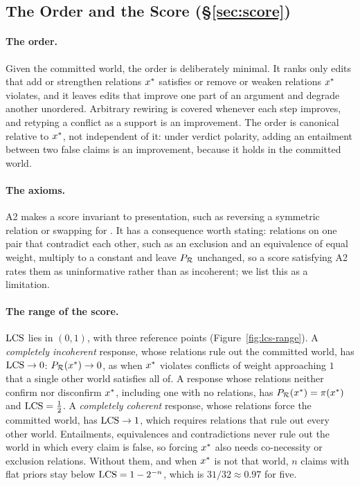 \subsection{The Order and the Score (\S\ref{sec:score})}

\paragraph{The order.} Given the committed world, the order is deliberately minimal. It ranks only
edits that add or strengthen relations $x^{\ast}$ satisfies or remove or weaken relations $x^{\ast}$
violates, and it leaves edits that improve one part of an argument and degrade another unordered.
Arbitrary rewiring is covered whenever each step improves, and retyping a conflict as a support is
an improvement. The order is canonical relative to $x^{\ast}$, not independent of it: under verdict
polarity, adding an entailment between two false claims is an improvement, because it holds in the
committed world.

\paragraph{The axioms.} A2 makes a score invariant to presentation, such as reversing a symmetric
relation or swapping  for . It has a consequence worth stating:
relations on one pair that contradict each other, such as an exclusion and an equivalence of equal
weight, multiply to a constant and leave $P_{\mathcal{R}}$ unchanged, so a score satisfying A2 rates them as
uninformative rather than as incoherent; we list this as a limitation.

\paragraph{The range of the score.} $\mathrm{LCS}$ lies in $(0,1)$, with three reference points
(Figure~\ref{fig:lcs-range}). A \emph{completely incoherent} response, whose relations rule out the
committed world, has $\mathrm{LCS}\to0$: $P_{\mathcal{R}}(x^{\ast})\to0$, as when $x^{\ast}$ violates conflicts of weight
approaching $1$ that a single other world satisfies all of. A response whose relations neither
confirm nor disconfirm $x^{\ast}$, including one with no relations, has $P_{\mathcal{R}}(x^{\ast})=\pi(x^{\ast})$ and
$\mathrm{LCS}=\frac12$. A \emph{completely coherent} response, whose relations force the committed world,
has $\mathrm{LCS}\to1$, which requires relations that rule out every other world. Entailments, equivalences
and contradictions never rule out the world in which every claim is false, so forcing $x^{\ast}$ also
needs co-necessity or exclusion relations. Without them, and when $x^{\ast}$ is not that world, $n$
claims with flat priors stay below $\mathrm{LCS}=1-2^{-n}$, which is $31/32\approx0.97$ for five.

